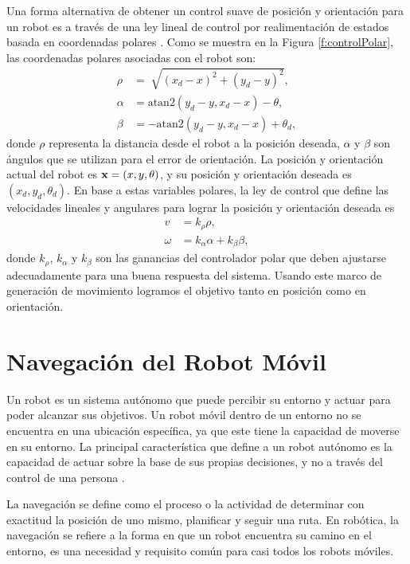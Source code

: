 Una forma alternativa de obtener un control suave de posición y orientación 
para un robot es a través de una ley lineal de control por realimentación 
de estados basada en coordenadas polares \cite{chwa2004sliding}. Como se muestra 
en la Figura \ref{f:controlPolar}, las coordenadas polares asociadas con el robot 
son:
\begin{align*}
\rho &= \sqrt[]{(x_{d} - x)^2 + (y_{d} - y)^2}, \\
\alpha &= \text{atan2}(y_{d} - y, x_{d} - x) - \theta, \\
\beta &= -\text{atan2}(y_{d} - y, x_{d} - x) + \theta_{d},
\end{align*}
donde $\rho$ representa la distancia desde el robot a la posición deseada, $\alpha$
y $\beta$ son ángulos que se utilizan para el error de orientación. La posición y 
orientación actual del robot es $\mathbf x=(x,y,\theta)$, y su posición y orientación deseada 
es $(x_{d},y_{d},\theta_{d})$. En base a estas variables polares, la ley de control que 
define las velocidades lineales y angulares para lograr la posición y orientación deseada 
es 
\begin{align}
\label{eqn:v}
v &= k_{\rho}\rho, \\
\label{eqn:w}
\omega &= k_{\alpha}\alpha + k_{\beta}\beta,
\end{align}
donde $k_{\rho}$, $k_{\alpha}$ y $k_{\beta}$ son las ganancias del controlador 
polar que deben ajustarse adecuadamente para una buena respuesta del sistema. Usando 
este marco de generación de movimiento logramos el objetivo tanto en posición 
como en orientación.

\section{Navegación del Robot Móvil}

Un robot es un sistema autónomo que puede percibir su entorno y actuar para poder
alcanzar sus objetivos. Un robot móvil dentro de un entorno no se encuentra en una 
ubicación específica, ya que este tiene la capacidad de moverse en su entorno. La 
principal característica que define a un robot autónomo es la capacidad de actuar 
sobre la base de sus propias decisiones, y no a través del control de una 
persona \cite{mataric2007robotics}.

La navegación se define como el proceso o la actividad de determinar con exactitud 
la posición de uno mismo, planificar y seguir una ruta. En robótica, la navegación 
se refiere a la forma en que un robot encuentra su camino en el entorno, es una 
necesidad y requisito común para casi todos los robots móviles. %


